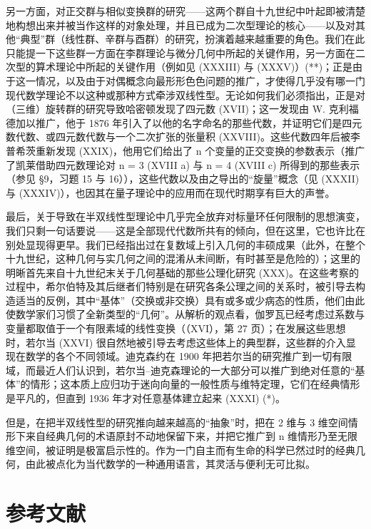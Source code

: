 另一方面，对正交群与相似变换群的研究——这两个群自十九世纪中叶起即被清楚地构想出来并被当作这样的对象处理，并且已成为二次型理论的核心——以及对其他“典型”群（线性群、辛群与酉群）的研究，扮演着越来越重要的角色。我们在此只能提一下这些群一方面在李群理论与微分几何中所起的关键作用，另一方面在二次型的算术理论中所起的关键作用（例如见 (XXXIII) 与 (XXXV)）(**)；正是由于这一情况，以及由于对偶概念向最形形色色问题的推广，才使得几乎没有哪一门现代数学理论不以这种或那种方式牵涉双线性型。无论如何我们必须指出，正是对（三维）旋转群的研究导致哈密顿发现了四元数 (XVII)；这一发现由 W. 克利福德加以推广，他于 1876 年引入了以他的名字命名的那些代数，并证明它们是四元数代数、或四元数代数与一个二次扩张的张量积 (XXVIII)。这些代数四年后被李普希茨重新发现 (XXIX)，他用它们给出了 n 个变量的正交变换的参数表示（推广了凯莱借助四元数理论对 n = 3 (XVIII a) 与 n = 4 (XVIII c) 所得到的那些表示（参见 §9，习题 15 与 16）），这些代数以及由之导出的“旋量”概念（见 (XXXII) 与 (XXXIV)），也因其在量子理论中的应用而在现代时期享有巨大的声誉。

最后，关于导致在半双线性型理论中几乎完全放弃对标量环任何限制的思想演变，我们只剩一句话要说——这是全部现代代数所共有的倾向，但在这里，它也许比在别处显现得更早。我们已经指出过在复数域上引入几何的丰硕成果（此外，在整个十九世纪，这种几何与实几何之间的混淆从未间断，有时甚至是危险的）；这里的明晰首先来自十九世纪末关于几何基础的那些公理化研究 (XXX)。在这些考察的过程中，希尔伯特及其后继者们特别是在研究各条公理之间的关系时，被引导去构造适当的反例，其中“基体”（交换或非交换）具有或多或少病态的性质，他们由此使数学家们习惯了全新类型的“几何”。从解析的观点看，伽罗瓦已经考虑过系数与变量都取值于一个有限素域的线性变换（（XVI），第 27 页）；在发展这些思想时，若尔当 (XXVI) 很自然地被引导去考虑这些体上的典型群，这些群的介入显现在数学的各个不同领域。迪克森约在 1900 年把若尔当的研究推广到一切有限域，而最近人们认识到，若尔当–迪克森理论的一大部分可以推广到绝对任意的“基体”的情形；这本质上应归功于迷向向量的一般性质与维特定理，它们在经典情形是平凡的，但直到 1936 年才对任意基体建立起来 (XXXI) (*)。

但是，在把半双线性型的研究推向越来越高的“抽象”时，把在 2 维与 3 维空间情形下来自经典几何的术语原封不动地保留下来，并把它推广到 n 维情形乃至无限维空间，被证明是极富启示性的。作为一门自主而有生命的科学已然过时的经典几何，由此被点化为当代数学的一种通用语言，其灵活与便利无可比拟。

\section*{参考文献}
{}

